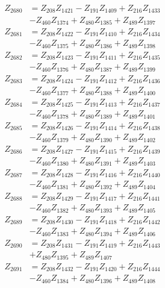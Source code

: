 \begin{multicols}{2}
\begin{align}
Z_{2680} &= Z_{208}Z_{1421} - Z_{191}Z_{1409} + Z_{216}Z_{1433}  \nonumber \\
&- Z_{460}Z_{1374} + Z_{480}Z_{1385} + Z_{489}Z_{1397} \nonumber \\
Z_{2681} &= Z_{208}Z_{1422} - Z_{191}Z_{1410} + Z_{216}Z_{1434}  \nonumber \\
&- Z_{460}Z_{1375} + Z_{480}Z_{1386} + Z_{489}Z_{1398} \nonumber \\
Z_{2682} &= Z_{208}Z_{1423} - Z_{191}Z_{1411} + Z_{216}Z_{1435}  \nonumber \\
&- Z_{460}Z_{1376} + Z_{480}Z_{1387} + Z_{489}Z_{1399} \nonumber \\
Z_{2683} &= Z_{208}Z_{1424} - Z_{191}Z_{1412} + Z_{216}Z_{1436}  \nonumber \\
&- Z_{460}Z_{1377} + Z_{480}Z_{1388} + Z_{489}Z_{1400} \nonumber \\
Z_{2684} &= Z_{208}Z_{1425} - Z_{191}Z_{1413} + Z_{216}Z_{1437}  \nonumber \\
&- Z_{460}Z_{1378} + Z_{480}Z_{1389} + Z_{489}Z_{1401} \nonumber \\
Z_{2685} &= Z_{208}Z_{1426} - Z_{191}Z_{1414} + Z_{216}Z_{1438}  \nonumber \\
&- Z_{460}Z_{1379} + Z_{480}Z_{1390} + Z_{489}Z_{1402} \nonumber \\
Z_{2686} &= Z_{208}Z_{1427} - Z_{191}Z_{1415} + Z_{216}Z_{1439}  \nonumber \\
&- Z_{460}Z_{1380} + Z_{480}Z_{1391} + Z_{489}Z_{1403} \nonumber \\
Z_{2687} &= Z_{208}Z_{1428} - Z_{191}Z_{1416} + Z_{216}Z_{1440}  \nonumber \\
&- Z_{460}Z_{1381} + Z_{480}Z_{1392} + Z_{489}Z_{1404} \nonumber \\
Z_{2688} &= Z_{208}Z_{1429} - Z_{191}Z_{1417} + Z_{216}Z_{1441}  \nonumber \\
&- Z_{460}Z_{1382} + Z_{480}Z_{1393} + Z_{489}Z_{1405} \nonumber \\
Z_{2689} &= Z_{208}Z_{1430} - Z_{191}Z_{1418} + Z_{216}Z_{1442}  \nonumber \\
&- Z_{460}Z_{1383} + Z_{480}Z_{1394} + Z_{489}Z_{1406} \nonumber \\
Z_{2690} &= Z_{208}Z_{1431} - Z_{191}Z_{1419} + Z_{216}Z_{1443}  \nonumber \\
&+ Z_{480}Z_{1395} + Z_{489}Z_{1407} \nonumber \\
Z_{2691} &= Z_{208}Z_{1432} - Z_{191}Z_{1420} + Z_{216}Z_{1444}  \nonumber \\
&- Z_{460}Z_{1384} + Z_{480}Z_{1396} + Z_{489}Z_{1408} \nonumber \\

\end{align}
\end{multicols}
